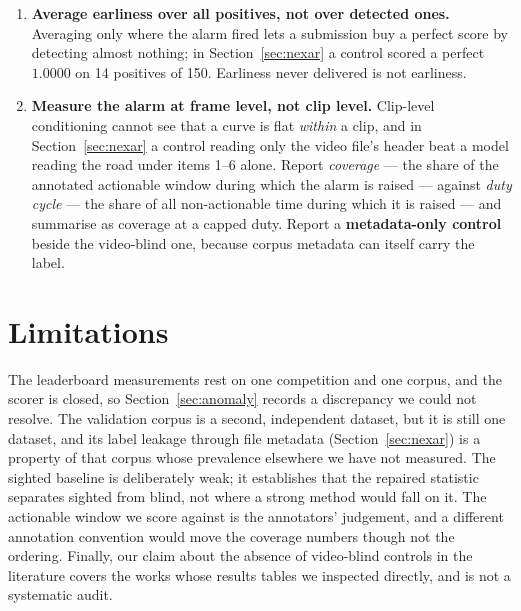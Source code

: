 \begin{enumerate}
{  leaderboard.} Organisers can do in an afternoon what took us twenty-five
  submissions, and an entrant would then see at a glance how much of their
  score they earned. For competitions that withhold labels, publish the weights
  and the scorer too: withholding labels prevents overfitting, but withholding
  the weights does not prevent the metric being exploited --- this paper
  exploited it comprehensively without them --- while it does prevent the
  sanity check that would have surfaced the problem before the competition
  opened.
\item \textbf{Average earliness over all positives, not over detected ones.}
  Averaging only where the alarm fired lets a submission buy a perfect score by
  detecting almost nothing; in Section~\ref{sec:nexar} a control scored a
  perfect $1.0000$ on 14 positives of 150. Earliness never delivered is not
  earliness.
\item \textbf{Measure the alarm at frame level, not clip level.} Clip-level
  conditioning cannot see that a curve is flat \emph{within} a clip, and in
  Section~\ref{sec:nexar} a control reading only the video file's header beat a
  model reading the road under items 1--6 alone. Report \emph{coverage} --- the
  share of the annotated actionable window during which the alarm is raised ---
  against \emph{duty cycle} --- the share of all non-actionable time during
  which it is raised --- and summarise as coverage at a capped duty. Report a
  \textbf{metadata-only control} beside the video-blind one, because corpus
  metadata can itself carry the label.
\end{enumerate}

\section{Limitations}
\label{sec:limits}

The leaderboard measurements rest on one competition and one corpus, and the
scorer is closed, so Section~\ref{sec:anomaly} records a discrepancy we could
not resolve. The validation corpus is a second, independent dataset, but it is
still one dataset, and its label leakage through file metadata
(Section~\ref{sec:nexar}) is a property of that corpus whose prevalence
elsewhere we have not measured. The sighted baseline is deliberately weak; it
establishes that the repaired statistic separates sighted from blind, not where
a strong method would fall on it. The actionable window we score against is the
annotators' judgement, and a different annotation convention would move the
coverage numbers though not the ordering. Finally, our claim about the absence
of video-blind controls in the literature covers the works whose results tables
we inspected directly, and is not a systematic audit.

